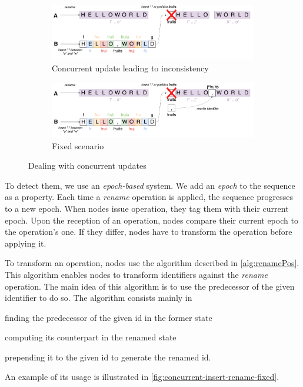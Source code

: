 \documentclass[sigplan,10pt]{acmart}
\begin{document}
\begin{figure}
    \centering
    \begin{subfigure}{0.45\textwidth}
        \includegraphics[width=1\textwidth]{img/concurrent-insert-rename-inconsistent.png}
        \caption{Concurrent update leading to inconsistency}
        \label{fig:concurrent-insert-rename-inconsistent}
    \end{subfigure}
    \begin{subfigure}{0.45\textwidth}
        \includegraphics[width=1\textwidth]{img/concurrent-insert-rename-fixed.png}
        \caption{Fixed scenario}
        \label{fig:concurrent-insert-rename-fixed}
    \end{subfigure}
    \caption{Dealing with concurrent updates}
    \label{fig:concurrent-insert-rename}
\end{figure}

To detect them, we use an \emph{epoch-based} system.
We add an \emph{epoch} to the sequence as a property.
Each time a \emph{rename} operation is applied, the sequence progresses to a new epoch.
When nodes issue operation, they tag them with their current epoch.
Upon the reception of an operation, nodes compare their current epoch to the operation's one.
If they differ, nodes have to transform the operation before applying it.

To transform an operation, nodes use the algorithm described in \autoref{alg:renamePos}.
This algorithm enables nodes to transform identifiers against the \emph{rename} operation.
The main idea of this algorithm is to use the predecessor of the given identifier to do so.
The algorithm consists mainly in
\begin{enumerate*}
    \item finding the predecessor of the given id in the former state
    \item computing its counterpart in the renamed state
    \item prepending it to the given id to generate the renamed id.
\end{enumerate*}
An example of its usage is illustrated in \autoref{fig:concurrent-insert-rename-fixed}.
\end{document}
